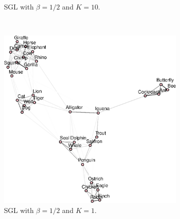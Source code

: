 \begin{figure}[!htb]
\begin{subfigure}[b]{0.475\textwidth}
      \caption{\textsf{SGL} with $\beta = 1/2$ and $K = 10$.}
    \end{subfigure}\\
    \begin{subfigure}[b]{0.475\textwidth}
      \includegraphics[width=\textwidth]{animals/graphs_for_different_k/animals_graph_k1.eps}
      \caption{\textsf{SGL} with $\beta = 1/2$ and $K = 1$.}
    \end{subfigure}
    ~
    \begin{subfigure}[b]{0.475\textwidth}

\end{subfigure}
\end{figure}
